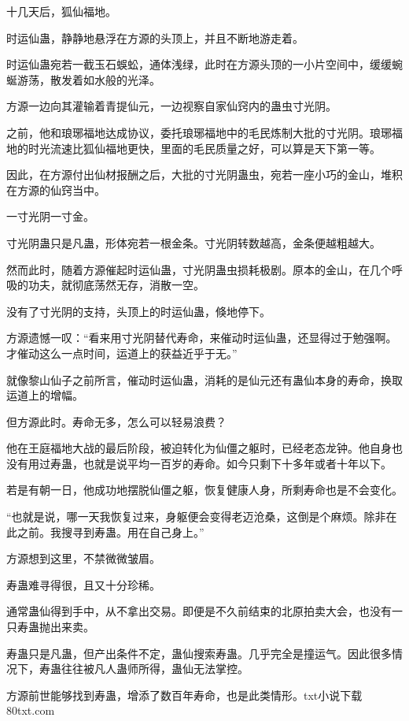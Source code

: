 
\begin{this_body}

十几天后，狐仙福地。

时运仙蛊，静静地悬浮在方源的头顶上，并且不断地游走着。

时运仙蛊宛若一截玉石蜈蚣，通体浅绿，此时在方源头顶的一小片空间中，缓缓蜿蜒游荡，散发着如水般的光泽。

方源一边向其灌输着青提仙元，一边视察自家仙窍内的蛊虫寸光阴。

之前，他和琅琊福地达成协议，委托琅琊福地中的毛民炼制大批的寸光阴。琅琊福地的时光流速比狐仙福地更快，里面的毛民质量之好，可以算是天下第一等。

因此，在方源付出仙材报酬之后，大批的寸光阴蛊虫，宛若一座小巧的金山，堆积在方源的仙窍当中。

一寸光阴一寸金。

寸光阴蛊只是凡蛊，形体宛若一根金条。寸光阴转数越高，金条便越粗越大。

然而此时，随着方源催起时运仙蛊，寸光阴蛊虫损耗极剧。原本的金山，在几个呼吸的功夫，就彻底荡然无存，消散一空。

没有了寸光阴的支持，头顶上的时运仙蛊，倏地停下。

方源遗憾一叹：“看来用寸光阴替代寿命，来催动时运仙蛊，还显得过于勉强啊。才催动这么一点时间，运道上的获益近乎于无。”

就像黎山仙子之前所言，催动时运仙蛊，消耗的是仙元还有蛊仙本身的寿命，换取运道上的增幅。

但方源此时。寿命无多，怎么可以轻易浪费？

他在王庭福地大战的最后阶段，被迫转化为仙僵之躯时，已经老态龙钟。他自身也没有用过寿蛊，也就是说平均一百岁的寿命。如今只剩下十多年或者十年以下。

若是有朝一日，他成功地摆脱仙僵之躯，恢复健康人身，所剩寿命也是不会变化。

“也就是说，哪一天我恢复过来，身躯便会变得老迈沧桑，这倒是个麻烦。除非在此之前。我搜寻到寿蛊。用在自己身上。”

方源想到这里，不禁微微皱眉。

寿蛊难寻得很，且又十分珍稀。

通常蛊仙得到手中，从不拿出交易。即便是不久前结束的北原拍卖大会，也没有一只寿蛊抛出来卖。

寿蛊只是凡蛊，但产出条件不定，蛊仙搜索寿蛊。几乎完全是撞运气。因此很多情况下，寿蛊往往被凡人蛊师所得，蛊仙无法掌控。

方源前世能够找到寿蛊，增添了数百年寿命，也是此类情形。txt小说下载80txt.com


\end{this_body}
